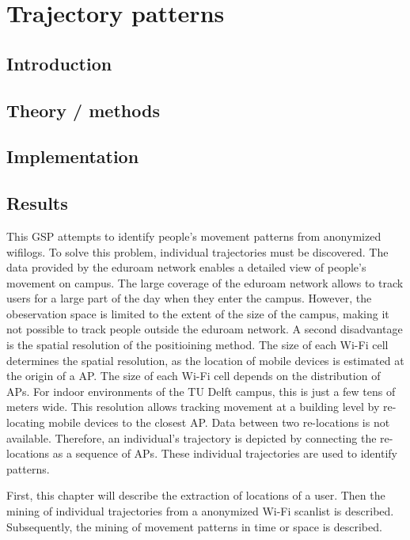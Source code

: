 \chapter{Trajectory patterns}
\section{Introduction}
\section{Theory / methods}
\section{Implementation}
\section{Results}

This GSP attempts to identify people’s movement patterns from anonymized wifilogs. To solve this problem, individual trajectories must be discovered. The data provided by the eduroam network enables a detailed view of people’s movement on campus. The large coverage of the eduroam network allows to track users for a large part of the day when they enter the campus. However, the obeservation space is limited to the extent of the size of the campus, making it not possible to track people outside the eduroam network. A second disadvantage is the spatial resolution of the positioining method. The size of each Wi-Fi cell determines the spatial resolution, as the location of mobile devices is estimated at the origin of a AP. The size of each Wi-Fi cell depends on the distribution of APs. For indoor environments of the TU Delft campus, this is just a few tens of meters wide. This resolution allows tracking movement at a building level by re-locating mobile devices to the closest AP. Data between two re-locations is not available. Therefore, an individual’s trajectory is depicted by connecting the re-locations as a sequence of APs. These individual trajectories are used to identify patterns. 

First, this chapter will describe the extraction of locations of a user. Then the mining of individual trajectories from a anonymized Wi-Fi scanlist is described. Subsequently, the mining of movement patterns in time or space is described. 

